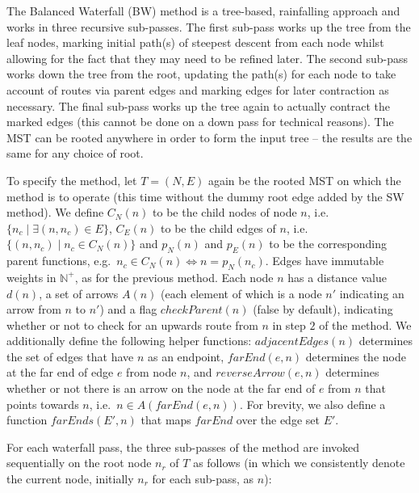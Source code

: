 \documentclass[preprint,a4paper]{elsarticle}
\newcommand{\funcname}[1]{\mathit{#1}}
\begin{document}
The Balanced Waterfall (BW) method is a tree-based, rainfalling approach and works in three recursive sub-passes. The first sub-pass works up the tree from the leaf nodes, marking initial path(s) of steepest descent from each node whilst allowing for the fact that they may need to be refined later. The second sub-pass works down the tree from the root, updating the path(s) for each node to take account of routes via parent edges and marking edges for later contraction as necessary. The final sub-pass works up the tree again to actually contract the marked edges (this cannot be done on a down pass for technical reasons). The MST can be rooted anywhere in order to form the input tree -- the results are the same for any choice of root.

To specify the method, let $T = (N,E)$ again be the rooted MST on which the method is to operate (this time without the dummy root edge added by the SW method). We define $C_N(n)$ to be the child nodes of node $n$, i.e.~$\{n_c \; | \; \exists (n,n_c) \in E\}$, $C_E(n)$ to be the child edges of $n$, i.e.~$\{(n,n_c) \; | \; n_c \in C_N(n)\}$ and $p_N(n)$ and $p_E(n)$ to be the corresponding parent functions, e.g.~$n_c \in C_N(n) \Leftrightarrow n = p_N(n_c)$. Edges have immutable weights in $\mathbb{N}^+$, as for the previous method. Each node $n$ has a distance value $d(n)$, a set of arrows $A(n)$ (each element of which is a node $n'$ indicating an arrow from $n$ to $n'$) and a flag $\funcname{checkParent}(n)$ (false by default), indicating whether or not to check for an upwards route from $n$ in step $2$ of the method. We additionally define the following helper functions: $\funcname{adjacentEdges}(n)$ determines the set of edges that have $n$ as an endpoint, $\funcname{farEnd}(e,n)$ determines the node at the far end of edge $e$ from node $n$, and $\funcname{reverseArrow}(e,n)$ determines whether or not there is an arrow on the node at the far end of $e$ from $n$ that points towards $n$, i.e.~$n \in A(\funcname{farEnd}(e,n))$. For brevity, we also define a function $\funcname{farEnds}(E',n)$ that maps $\funcname{farEnd}$ over the edge set $E'$.

For each waterfall pass, the three sub-passes of the method are invoked sequentially on the root node $n_r$ of $T$ as follows (in which we consistently denote the current node, initially $n_r$ for each sub-pass, as $n$):
\end{document}
